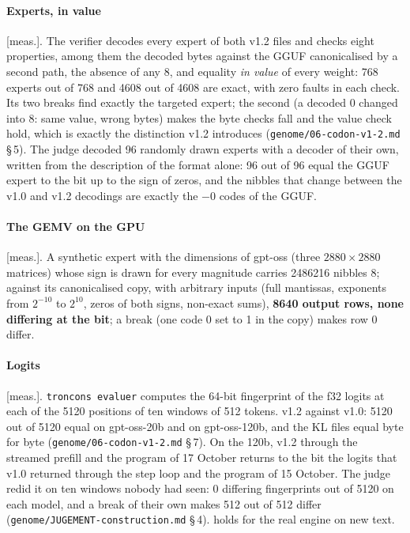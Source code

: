 \documentclass[11pt, a4paper]{article}
\theoremstyle{remark}
\newcommand{\etiq}[1]{\textsf{\scriptsize[#1]}}
\newcommand{\mes}{\etiq{meas.}}
\newcommand{\fichier}[1]{\textsf{\footnotesize\nolinkurl{#1}}}
\begin{document}
\paragraph{Experts, in value} \mes. The verifier decodes every expert of both v1.2 files and checks eight properties, among them the decoded bytes against the GGUF canonicalised by a second path, the absence of any 8, and equality \emph{in value} of every weight: 768 experts out of 768 and \num{4608} out of \num{4608} are exact, with zero faults in each check. Its two breaks find exactly the targeted expert; the second (a decoded 0 changed into 8: same value, wrong bytes) makes the byte checks fall and the value check hold, which is exactly the distinction v1.2 introduces (\fichier{genome/06-codon-v1-2.md} §\,5). The judge decoded 96 randomly drawn experts with a decoder of their own, written from the description of the format alone: 96 out of 96 equal the GGUF expert to the bit up to the sign of zeros, and the nibbles that change between the v1.0 and v1.2 decodings are exactly the $-0$ codes of the GGUF.

\paragraph{The GEMV on the GPU} \mes. A synthetic expert with the dimensions of gpt-oss (three $2880 \times 2880$ matrices) whose sign is drawn for every magnitude carries \num{2486216} nibbles 8; against its canonicalised copy, with arbitrary inputs (full mantissas, exponents from $2^{-10}$ to $2^{10}$, zeros of both signs, non-exact sums), \textbf{\num{8640} output rows, none differing at the bit}; a break (one code 0 set to 1 in the copy) makes row 0 differ.

\paragraph{Logits} \mes. \texttt{troncons evaluer} computes the 64-bit fingerprint of the f32 logits at each of the \num{5120} positions of ten windows of 512 tokens. v1.2 against v1.0: \num{5120} out of \num{5120} equal on gpt-oss-20b and on gpt-oss-120b, and the KL files equal byte for byte (\fichier{genome/06-codon-v1-2.md} §\,7). On the 120b, v1.2 through the streamed prefill and the program of 17 October returns to the bit the logits that v1.0 returned through the step loop and the program of 15 October. The judge redid it on ten windows nobody had seen: 0 differing fingerprints out of \num{5120} on each model, and a break of their own makes 512 out of 512 differ (\fichier{genome/JUGEMENT-construction.md} §\,4).  holds for the real engine on new text.
\end{document}
